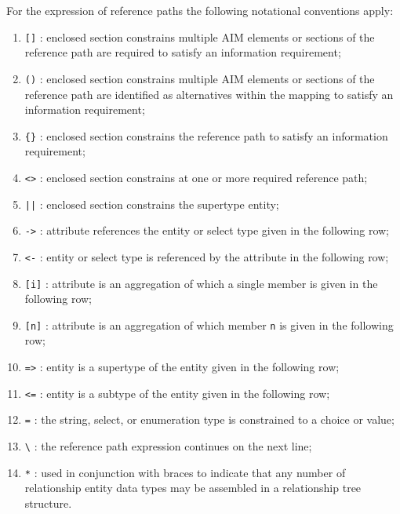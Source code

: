   For the expression of reference paths the following notational
conventions apply:
\begin{enumerate}
\item \verb|[]| : enclosed section constrains multiple AIM elements
    or sections of the
    reference path are required to satisfy an information
    requirement;
\item \verb|()| : enclosed section constrains multiple AIM elements
    or sections of the
    reference path are identified as alternatives within the
    mapping to satisfy an information requirement;
\item \verb|{}| : enclosed section constrains the reference path
    to satisfy an information requirement;
\item \verb|<>| : enclosed section constrains at one or more
     required reference path;
\item \verb+||+ : enclosed section constrains the supertype entity;
\item \verb|->| : attribute references the entity or select type
    given in the following row;
\item \verb|<-| : entity or select type is referenced by the
     attribute in the following row;
\item \verb|[i]| : attribute is an aggregation of which a
     single member is given in the following row;
\item \verb|[n]| : attribute is an aggregation of which
     member \verb|n| is given in the following row;
\item \verb|=>| : entity is a supertype of the entity given in the
    following row;
\item \verb|<=| : entity is a subtype of the entity given in
    the following row;
\item \verb|=| : the string, select, or enumeration type is
    constrained to a choice or value;
\item \verb|\| : the reference path expression continues on
    the next line;
\item \verb|*| : used in conjunction with braces to indicate that any
    number of relationship entity data types may be assembled in a
    relationship tree structure.
\end{enumerate}

\endinput
